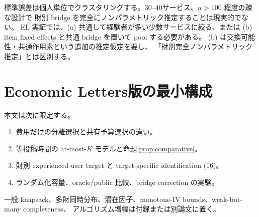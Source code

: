 \documentclass[a4paper,11pt]{ltjsarticle}
\newcommand{\1}{\mathbf 1}
\theoremstyle{definition}
\theoremstyle{plain}
\theoremstyle{remark}
\begin{document}
標準誤差は個人単位でクラスタリングする。30--40サービス、$n>100$ 程度の疎な設計で
財別 bridge を完全にノンパラメトリック推定することは現実的でない。
EL 実証では、(a) 共通して経験者が多い少数サービスに絞る、または
(b) item fixed effects と共通 bridge を置いて pool する必要がある。
(b) は交換可能性・共通作用素という追加の推定仮定を要し、
「財別完全ノンパラメトリック推定」とは区別する。

\section{Economic Letters版の最小構成}

本文は次に限定する。
\begin{enumerate}
  \item 費用だけの分離選択と共有予算選択の違い。
  \item 等投稿時間の at-most-$K$ モデルと命題\ref{prop:comparative}。
  \item 財別 experienced-user target と target-specific identification (16)。
  \item ランダム化容量、oracle/public 比較、bridge correction の実験。
\end{enumerate}
一般 knapsack、多財同時分布、潜在因子、monotone-IV bounds、weak-but-many completeness、
アルゴリズム増幅は付録または別論文に置く。

\printbibliography
\end{document}

